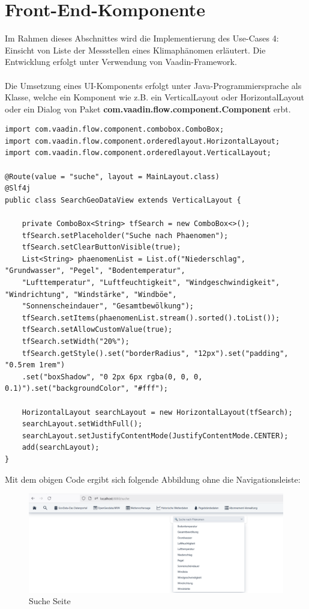 \documentclass[a4paper,12pt]{scrreprt}
\begin{document}
\section{Front-End-Komponente }
Im Rahmen dieses Abschnittes wird die Implementierung des Use-Cases 4: Einsicht von Liste der Messstellen eines Klimaphänomen erläutert. Die Entwicklung erfolgt unter Verwendung von Vaadin-Framework.\\ \\
Die Umsetzung eines UI-Komponents erfolgt unter Java-Programmiersprache als Klasse, welche ein Komponent wie z.B. ein VerticalLayout oder HorizontalLayout oder ein Dialog von Paket \textbf{com.vaadin.flow.component.Component} erbt.
\begin{lstlisting}
import com.vaadin.flow.component.combobox.ComboBox;
import com.vaadin.flow.component.orderedlayout.HorizontalLayout;
import com.vaadin.flow.component.orderedlayout.VerticalLayout;
		
@Route(value = "suche", layout = MainLayout.class)
@Slf4j
public class SearchGeoDataView extends VerticalLayout {
			
	private ComboBox<String> tfSearch = new ComboBox<>();
	tfSearch.setPlaceholder("Suche nach Phaenomen");
	tfSearch.setClearButtonVisible(true);
	List<String> phaenomenList = List.of("Niederschlag", "Grundwasser", "Pegel", "Bodentemperatur",
	"Lufttemperatur", "Luftfeuchtigkeit", "Windgeschwindigkeit", "Windrichtung", "Windstärke", "Windböe",
	"Sonnenscheindauer", "Gesamtbewölkung");
	tfSearch.setItems(phaenomenList.stream().sorted().toList());
	tfSearch.setAllowCustomValue(true);
	tfSearch.setWidth("20%");
	tfSearch.getStyle().set("borderRadius", "12px").set("padding", "0.5rem 1rem")
	.set("boxShadow", "0 2px 6px rgba(0, 0, 0, 0.1)").set("backgroundColor", "#fff");
		
	HorizontalLayout searchLayout = new HorizontalLayout(tfSearch);
	searchLayout.setWidthFull();
	searchLayout.setJustifyContentMode(JustifyContentMode.CENTER);
	add(searchLayout);
}
\end{lstlisting}
Mit dem obigen Code ergibt sich folgende Abbildung ohne die Navigationsleiste: 
\begin{figure}[h!]
	\centering
	\includegraphics[width=17cm]{suchSeite.png}
	\caption{\label{suche:Seite}Suche Seite}
\end{figure}
	
\end{document}
